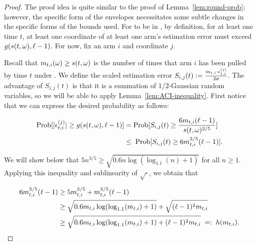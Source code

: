 \begin{proof}
The proof idea is quite similar to the proof of
Lemma~\ref{lem:round-prob};
however, the specific form of the envelopes necessitates some subtle
changes in the specific forms of the bounds used.
For \SP to be in \Env{\ell}, by definition,
for at least one time $t$,
at least one coordinate of at least one arm's estimation error must
exceed $g(s(t,\omega),\ell-1)$.
For now, fix an arm $i$ and coordinate $j$.

Recall that $m_{t,i}(\omega) \geq s(t,\omega)$ is the number of times
that arm $i$ has been pulled by time $t$ under \SP.
We define the scaled estimation error
$S_{i,j}(t) := \frac{m_{t,i} \cdot \epsilon_{t,i}^{(j)}}{2\sigma}$.
The advantage of $S_{i,j}(t)$ is that it is 
a summation of $1/2$-Gaussian random variables, 
so we will be able to apply Lemma~\ref{lem:ACI-inequality}.
First notice that we can express the desired probability as follows:

\begin{align*}
\Prob{|\Err{t}{i}{j}| \geq g(s(t,\SP), \ell-1)}
& = \Prob{S_{i,j}(t) \geq \frac{6\NumPull{t}{i}(\ell-1)}{s(t,\SP)^{2/5}}}\\
& \leq \; \Prob{S_{i,j}(t) \geq 6\NumPull{t}{i}^{3/5}(\ell-1)}. 
\end{align*}

We will show below that
$5 n^{3/5} \geq \sqrt{0.6n \log(\log_{1.1}(n)+1)}$
for all $n \geq 1$.
Applying this inequality and sublinearity of $\sqrt{\cdot}$,
we obtain that

\begin{align*}
6 m_{t,i}^{3/5}(\ell-1)
& \geq 5 m_{t,i}^{3/5} + m_{t,i}^{3/5}(\ell-1)  \\
& \geq \sqrt{0.6 m_{t,i} \log(\log_{1.1}(m_{t,i})+1)}
     + \sqrt{(\ell-1)^2 m_{t,i}}  \\
& \geq \sqrt{0.6m_{t,i}\log(\log_{1.1}(m_{t,i})+1)+(\ell-1)^2 m_{t,i}}
\; =: \; h(m_{t,i}).
\end{align*}


\end{proof}
